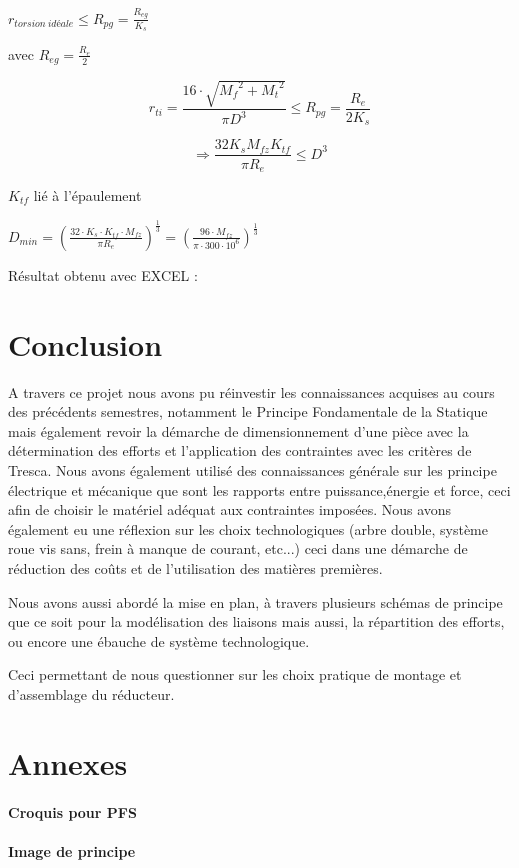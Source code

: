$r_{torsion\ idéale} \leq R_{pg }= \frac{R_{eg}}{K_s}$ \n

avec $R_{eg}=\frac{R_e}{2}$ 

$$r_{ti}=  \frac{16 \cdot \sqrt{{M_f}^2 + {M_t}^2}}{\pi D^3} \leq R_{pg} = \frac{R_e}{2K_s} $$


 $$\Rightarrow \frac{32 K_s M_{fz} K_{tf}}{\pi R_e} \leq D^3$$

\n 
$K_{tf} $ lié à l'épaulement 

$ D_{min} = (\frac{32\cdot K_s \cdot K_{tf} \cdot M_{fz}}{\pi R_e})^{\frac{1}{3}} = {(\frac{96 \cdot M_{fz}}{\pi \cdot 300\cdot 10^{6}})}^{\frac{1}{3}} $\n

Résultat obtenu avec EXCEL :  

\chapter{Conclusion}
A travers ce projet nous avons pu réinvestir les connaissances acquises au cours des précédents
semestres, notamment le Principe Fondamentale de la Statique mais également revoir la démarche de dimensionnement d'une pièce avec la détermination des efforts et l'application des contraintes avec les critères de Tresca.\n
    Nous avons également utilisé des   
connaissances générale sur les principe électrique 
et mécanique que sont les rapports entre 
puissance,énergie et force, ceci afin de choisir le 
matériel adéquat aux contraintes imposées.
    Nous avons également eu une réflexion sur les 
choix
technologiques (arbre double, système roue vis sans, 
frein à manque de courant, etc...)  ceci dans une 
démarche de réduction des coûts et de l'utilisation des matières 
premières. \n

Nous avons aussi abordé la mise en plan, à travers plusieurs schémas de principe que ce soit pour la modélisation des liaisons mais aussi, la répartition des efforts, ou encore une ébauche de système technologique. \n

Ceci permettant de nous questionner sur les choix pratique de montage et d'assemblage du réducteur.\n



\chapter{Annexes}

\subsubsection{Croquis pour PFS}

\subsubsection{Image de principe}



